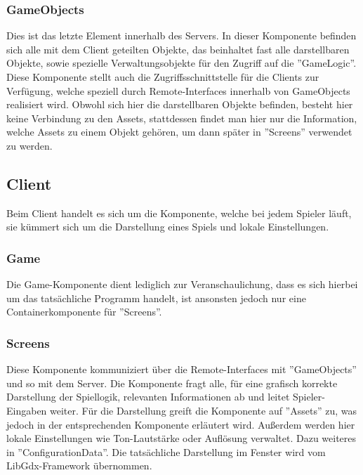 \documentclass[fontsize=12pt,paper=a4,twoside]{scrartcl}
\begin{document}
\subsubsection{GameObjects}

Dies ist das letzte Element innerhalb des Servers. In dieser Komponente befinden sich alle mit dem Client geteilten Objekte, das beinhaltet fast alle darstellbaren Objekte, sowie spezielle Verwaltungsobjekte für den Zugriff auf die ''GameLogic''. Diese Komponente stellt auch die Zugriffsschnittstelle für die Clients zur Verfügung, welche speziell durch Remote-Interfaces innerhalb von GameObjects realisiert wird. Obwohl sich hier die darstellbaren Objekte befinden, besteht hier keine Verbindung zu den Assets, stattdessen findet man hier nur die Information, welche Assets zu einem Objekt gehören, um dann später in ''Screens'' verwendet zu werden.

\subsection{Client}

Beim Client handelt es sich um die Komponente, welche bei jedem Spieler läuft, sie kümmert sich um die Darstellung eines Spiels und lokale Einstellungen.

\subsubsection{Game}

Die Game-Komponente dient lediglich zur Veranschaulichung, dass es sich hierbei um das tatsächliche Programm handelt, ist ansonsten jedoch nur eine Containerkomponente für ''Screens''.

\subsubsection{Screens}

Diese Komponente kommuniziert über die Remote-Interfaces mit ''GameObjects'' und so mit dem Server. Die Komponente fragt alle, für eine grafisch korrekte Darstellung der Spiellogik, relevanten Informationen ab und leitet Spieler-Eingaben weiter. Für die Darstellung greift die Komponente auf ''Assets'' zu, was jedoch in der entsprechenden Komponente erläutert wird. Außerdem werden hier lokale Einstellungen wie Ton-Lautstärke oder Auflösung verwaltet. Dazu weiteres in ''ConfigurationData''. Die tatsächliche Darstellung im Fenster wird vom LibGdx-Framework übernommen.
\end{document}
